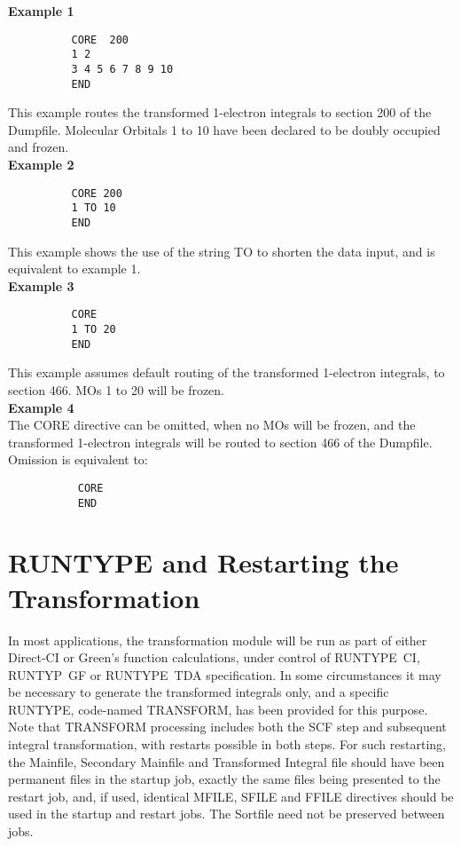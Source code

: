 \documentclass[11pt,fleqn]{article}
\begin{document}
{\bf Example 1}
{
\footnotesize
\begin{verbatim}
          CORE  200
          1 2
          3 4 5 6 7 8 9 10
          END
\end{verbatim}
}
This example routes the transformed 1-electron integrals to
section 200 of the Dumpfile. Molecular Orbitals 1 to 10
have been declared to be doubly occupied and frozen.\\

{\bf Example 2}
{
\footnotesize
\begin{verbatim}
          CORE 200
          1 TO 10
          END
\end{verbatim}
}
This example shows the use of the string TO to shorten the data input,
and is equivalent to example 1.\\

{\bf Example 3}
{
\footnotesize
\begin{verbatim}
          CORE
          1 TO 20 
          END
\end{verbatim}
}
This example assumes default routing of the transformed 1-electron
integrals, to section 466. MOs 1 to 20 will be frozen.\\

{\bf Example 4}\\

The CORE directive can be omitted, when no MOs will be frozen, and
the transformed 1-electron integrals will be routed to section 466
of the Dumpfile. Omission is equivalent to:

{
\footnotesize
\begin{verbatim}
           CORE
           END
\end{verbatim}
}


\section[RUNTYPE and Restarting the Transformation]{RUNTYPE and Restarting the Transformation}

In most applications, the transformation module will be run as part of 
either Direct-CI or Green's function calculations, under control
of RUNTYPE~CI, RUNTYP~GF or RUNTYPE~TDA specification. 
In some circumstances 
it may be necessary to generate the transformed integrals only, and
a specific RUNTYPE, code-named TRANSFORM, has been provided for
this purpose. Note that TRANSFORM processing includes both the
SCF step and subsequent integral transformation, with restarts
possible in both steps. 
For  such restarting, the Mainfile, Secondary Mainfile and
Transformed Integral file 
should have been permanent files in the startup job,
exactly the same files being presented to the restart job, and, if used,
identical MFILE, SFILE and FFILE directives should be used in the 
startup and restart jobs. 
The Sortfile need not be preserved between jobs.\\
\end{document}
